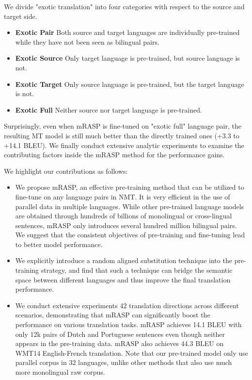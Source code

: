 \documentclass[11pt,a4paper]{article}
\newcommand{\method}{mRASP\xspace}
\begin{document}
We divide "exotic translation" into four categories with respect to the source and target side.
\begin{itemize}
    \setlength{\itemsep}{0pt}
    \setlength{\parsep}{0pt}
    \setlength{\parskip}{0pt}
\item \textbf{Exotic Pair} Both source and target languages are individually pre-trained while they have not been seen as bilingual pairs.
\item \textbf{Exotic Source} Only target language is pre-trained, but source language is not.
\item \textbf{Exotic Target} Only source language is pre-trained, but the target language is not.
\item \textbf{Exotic Full} Neither source nor target language is pre-trained. 
\end{itemize}

 Surprisingly, even when \method is fine-tuned on "exotic full" language pair, the resulting MT model is still much better than the directly trained ones (+3.3 to +14.1 BLEU). 
We finally conduct extensive analytic experiments to examine the contributing factors inside the \method method for the performance gains. 
















We highlight our contributions as follows:
\begin{itemize}
    \item We propose \method, an effective  pre-training method that can be utilized to fine-tune on any language pairs in NMT. 
    It is very efficient in the use of parallel data in multiple languages. 
    While other pre-trained language models are obtained through hundreds of billions of monolingual or cross-lingual sentences, \method only introduces several hundred million bilingual pairs. We suggest that the consistent objectives of pre-training and fine-tuning lead to better model performance.
    \item We explicitly introduce a random aligned substitution technique into the pre-training strategy, and find that such a technique can bridge the semantic space between different languages and thus improve the final translation performance.
\item We conduct extensive experiments 42 translation directions across different scenarios, demonstrating that \method can significantly boost the performance on various translation tasks. \method achieves 14.1 BLEU with only 12k  pairs of Dutch and Portuguese sentences even though neither appears in the pre-training data. 
    \method also achieves 44.3 BLEU on WMT14 English-French translation. 
    Note that our pre-trained model only use parallel corpus in 32 languages, unlike other methods that also use much more monolingual raw corpus. 
\end{itemize}
 
\end{document}
